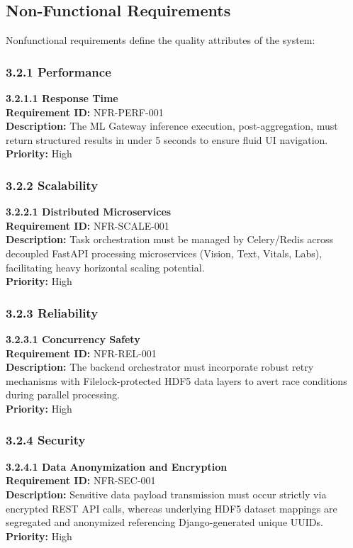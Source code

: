 \documentclass{fisatprojectfinal}
\begin{document}
\subsection{Non-Functional Requirements}
Nonfunctional requirements define the quality attributes of the system:

\subsubsection{3.2.1 Performance}
\textbf{3.2.1.1 Response Time} \\
\textbf{Requirement ID:} NFR-PERF-001 \\
\textbf{Description:} The ML Gateway inference execution, post-aggregation, must return structured results in under 5 seconds to ensure fluid UI navigation. \\
\textbf{Priority:} High

\subsubsection{3.2.2 Scalability}
\textbf{3.2.2.1 Distributed Microservices} \\
\textbf{Requirement ID:} NFR-SCALE-001 \\
\textbf{Description:} Task orchestration must be managed by Celery/Redis across decoupled FastAPI processing microservices (Vision, Text, Vitals, Labs), facilitating heavy horizontal scaling potential. \\
\textbf{Priority:} High

\subsubsection{3.2.3 Reliability}
\textbf{3.2.3.1 Concurrency Safety} \\
\textbf{Requirement ID:} NFR-REL-001 \\
\textbf{Description:} The backend orchestrator must incorporate robust retry mechanisms with Filelock-protected HDF5 data layers to avert race conditions during parallel processing. \\
\textbf{Priority:} High

\subsubsection{3.2.4 Security}
\textbf{3.2.4.1 Data Anonymization and Encryption} \\
\textbf{Requirement ID:} NFR-SEC-001 \\
\textbf{Description:} Sensitive data payload transmission must occur strictly via encrypted REST API calls, whereas underlying HDF5 dataset mappings are segregated and anonymized referencing Django-generated unique UUIDs. \\
\textbf{Priority:} High
\end{document}
